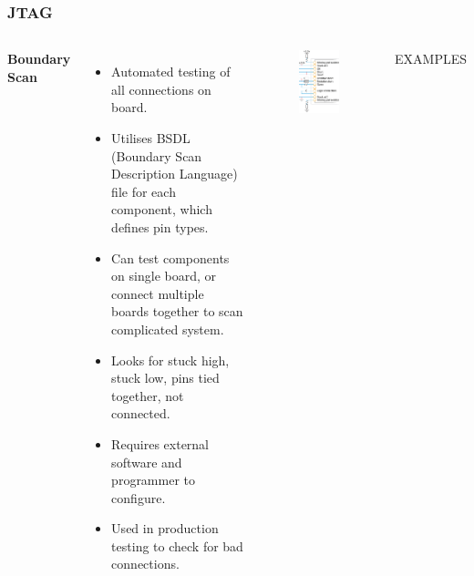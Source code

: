 \documentclass[t]{beamer}
\begin{document}
\begin{frame}[t]
\frametitle{JTAG}

\begin{columns}
	\textbf{Boundary Scan}
	\begin{itemize}
		\item Automated testing of all connections on board.
		\item Utilises BSDL (Boundary Scan Description Language) file for each component, which defines pin types. 
		\item Can test components on single board, or connect multiple boards together to scan complicated system. 
		\item Looks for stuck high, stuck low, pins tied together, not connected. 
		\item Requires external software and programmer to configure. 
		\item Used in production testing to check for bad connections.
	\end{itemize}
	
	\begin{figure}
		\includegraphics[width=\linewidth]{boundaryScanFaults.png}
	\end{figure}
	EXAMPLES
\end{columns}

\end{frame}
\end{document}
